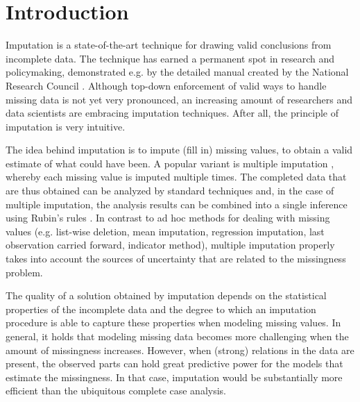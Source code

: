 \documentclass[bimj,fleqn]{w-art}
\begin{document}






\section{Introduction}

Imputation is a state-of-the-art technique for drawing valid conclusions from incomplete data. The technique has earned a permanent spot in research and policymaking, demonstrated e.g. by the detailed manual created by the National Research Council \citep*{little2012prevention}. Although top-down enforcement of valid ways to handle missing data is not yet very pronounced, an increasing amount of researchers and data scientists are embracing imputation techniques. After all, the principle of imputation is very intuitive.

The idea behind imputation is to impute (fill in) missing values, to obtain a valid estimate of what could have been. A popular variant is multiple imputation \citep{rubi76}, whereby each missing value is imputed multiple times. The completed data that are thus obtained can be analyzed by standard techniques and, in the case of multiple imputation, the analysis results can be combined into a single inference using Rubin's rules \citep[][p. 76]{rubi87}. In contrast to ad hoc methods for dealing with missing values (e.g. list-wise deletion, mean imputation, regression imputation, last observation carried forward, indicator method), multiple imputation properly takes into account the sources of uncertainty that are related to the missingness problem. 

The quality of a solution obtained by imputation depends on the statistical properties of the incomplete data and the degree to which an imputation procedure is able to capture these properties when modeling missing values. In general, it holds that modeling missing data becomes more challenging when the amount of missingness increases. However, when (strong) relations in the data are present, the observed parts can hold great predictive power for the models that estimate the missingness. In that case, imputation would be substantially more efficient than the ubiquitous complete case analysis.
\end{document}
